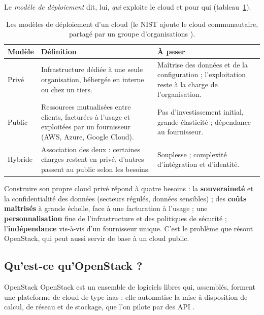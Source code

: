 Le \emph{modèle de déploiement} dit, lui, \emph{qui} exploite le cloud et pour qui (tableau~\ref{tab:pres-deploiement}).

\begin{table}[!ht]
\centering
\renewcommand{\arraystretch}{1.25}
\begin{tabular}{@{}>{\raggedright\arraybackslash}p{2.2cm}>{\raggedright\arraybackslash}p{6.9cm}>{\raggedright\arraybackslash}p{6.4cm}@{}}
\toprule
\textbf{Modèle} & \textbf{Définition} & \textbf{À peser} \\
\midrule
Privé & Infrastructure dédiée à une seule organisation, hébergée en interne ou chez un tiers. & Maîtrise des données et de la
  configuration ; l'exploitation reste à la charge de l'organisation. \\
Public & Ressources mutualisées entre clients, facturées à l'usage et exploitées par un fournisseur (AWS, Azure, Google Cloud). &
  Pas d'investissement initial, grande élasticité ; dépendance au fournisseur. \\
Hybride & Association des deux : certaines charges restent en privé, d'autres passent au public selon les besoins. & Souplesse ;
  complexité d'intégration et d'identité. \\
\bottomrule
\end{tabular}
\caption{Les modèles de déploiement d'un cloud (le NIST ajoute le cloud communautaire, partagé par un groupe d'organisations
\parencite{nist-cloud}).}
\label{tab:pres-deploiement}
\end{table}

Construire son propre cloud privé répond à quatre besoins : la \textbf{souveraineté} et la confidentialité des données (secteurs
régulés, données sensibles) ; des \textbf{coûts maîtrisés} à grande échelle, face à une facturation à l'usage ; une
\textbf{personnalisation} fine de l'infrastructure et des politiques de sécurité ; l'\textbf{indépendance} vis-à-vis d'un fournisseur
unique. C'est le problème que résout OpenStack, qui peut aussi servir de base à un cloud public.

\subsection{Qu'est-ce qu'OpenStack ?}\label{sec:pres-openstack}

\begin{definition}{OpenStack}
OpenStack est un ensemble de logiciels libres qui, assemblés, forment une plateforme de cloud de type \gls{iaas} : elle automatise la
mise à disposition de calcul, de réseau et de stockage, que l'on pilote par des API \parencite{openstack-site,install-overview}.
\end{definition}

